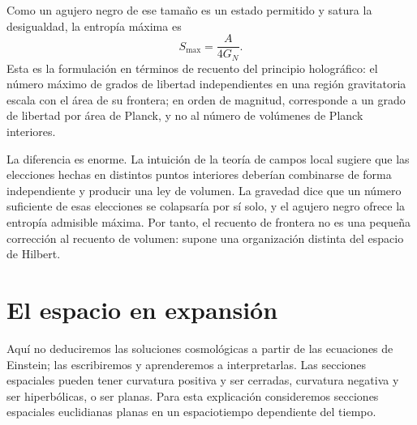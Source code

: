Como un agujero negro de ese tamaño es un estado permitido y satura la desigualdad, la entropía máxima es
\begin{equation}
S_{\max}=\frac{A}{4G_N}.
\label{eq:l07-holographic-maximum}
\end{equation}
Esta es la formulación en términos de recuento del principio holográfico: el número máximo de grados de libertad independientes en una región gravitatoria escala con el área de su frontera; en orden de magnitud, corresponde a un grado de libertad por área de Planck, y no al número de volúmenes de Planck interiores.

La diferencia es enorme. La intuición de la teoría de campos local sugiere que las elecciones hechas en distintos puntos interiores deberían combinarse de forma independiente y producir una ley de volumen. La gravedad dice que un número suficiente de esas elecciones se colapsaría por sí solo, y el agujero negro ofrece la entropía admisible máxima. Por tanto, el recuento de frontera no es una pequeña corrección al recuento de volumen: supone una organización distinta del espacio de Hilbert.

\begin{classroomqa}
\end{classroomqa}

\begin{classroomqa}
\end{classroomqa}

\section{El espacio en expansión}

Aquí no deduciremos las soluciones cosmológicas a partir de las ecuaciones de Einstein; las escribiremos y aprenderemos a interpretarlas. Las secciones espaciales pueden tener curvatura positiva y ser cerradas, curvatura negativa y ser hiperbólicas, o ser planas. Para esta explicación consideremos secciones espaciales euclidianas planas en un espaciotiempo dependiente del tiempo.

